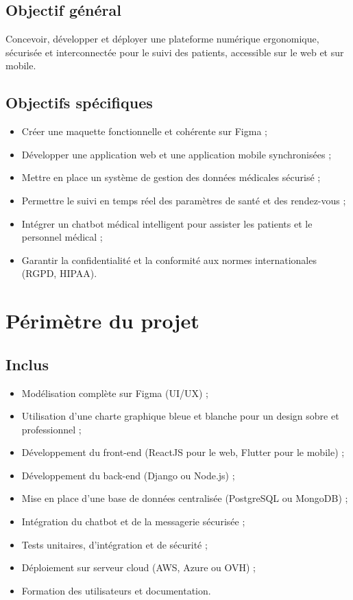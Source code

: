 ﻿\documentclass[12pt,a4paper]{report}
\begin{document}
\subsection*{Objectif général}  
Concevoir, développer et déployer une plateforme numérique ergonomique, sécurisée et interconnectée pour le suivi des patients, accessible sur le web et sur mobile.  

\subsection*{Objectifs spécifiques}  
\begin{itemize}
    \item Créer une maquette fonctionnelle et cohérente sur Figma ;
    \item Développer une application web et une application mobile synchronisées ;
    \item Mettre en place un système de gestion des données médicales sécurisé ;
    \item Permettre le suivi en temps réel des paramètres de santé et des rendez-vous ;
    \item Intégrer un chatbot médical intelligent pour assister les patients et le personnel médical ;
    \item Garantir la confidentialité et la conformité aux normes internationales (RGPD, HIPAA).
\end{itemize}

\newpage  
\section*{Périmètre du projet}  

\subsection*{Inclus}  
\begin{itemize}
    \item Modélisation complète sur Figma (UI/UX) ;
    \item Utilisation d’une charte graphique bleue et blanche pour un design sobre et professionnel ;
    \item Développement du front-end (ReactJS pour le web, Flutter pour le mobile) ;
    \item Développement du back-end (Django ou Node.js) ;
    \item Mise en place d’une base de données centralisée (PostgreSQL ou MongoDB) ;
    \item Intégration du chatbot et de la messagerie sécurisée ;
    \item Tests unitaires, d’intégration et de sécurité ;
    \item Déploiement sur serveur cloud (AWS, Azure ou OVH) ;
    \item Formation des utilisateurs et documentation.
\end{itemize}
\end{document}
